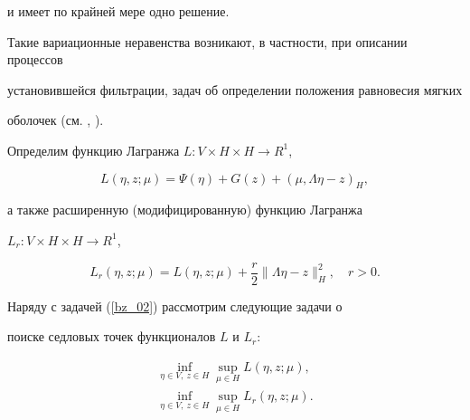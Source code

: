 и имеет по крайней мере одно решение.


Такие вариационные неравенства возникают, в частности, при описании процессов


установившейся фильтрации, задач об определении положения равновесия мягких


оболочек (см. \cite{BS_IV_92}, \cite{Lap_1979}).





Определим функцию Лагранжа $L:V \times H \times H \to R^1$,


$$


L(\eta,z;\mu)=\Psi (\eta)+G(z)+(\mu,\Lambda \eta-z)_H,


$$


а также расширенную (модифицированную) функцию Лагранжа \cite{FG_83} 


$L_r : V \times H \times H \to R^1$,


\begin{equation}


L_r (\eta, z; \mu)=L (\eta, z; \mu)+


\frac {r} {2} \| {\Lambda \eta-z}\|_H^2, \quad r >0.


\label{bz_05}


\end{equation}


Наряду с задачей (\ref{bz_02}) рассмотрим следующие задачи о


поиске седловых точек функционалов $L$ и $L_r$:


\begin{gather}


\inf_{\eta \in V,\ z\in H}


\sup_{\mu \in H}L (\eta, z; \mu),


\label{bz_06} \\


%


\inf_{\eta \in V,\ z \in H}


\sup_{\mu \in H} L_r (\eta, z; \mu).


\label{bz_07}


\end{gather}





